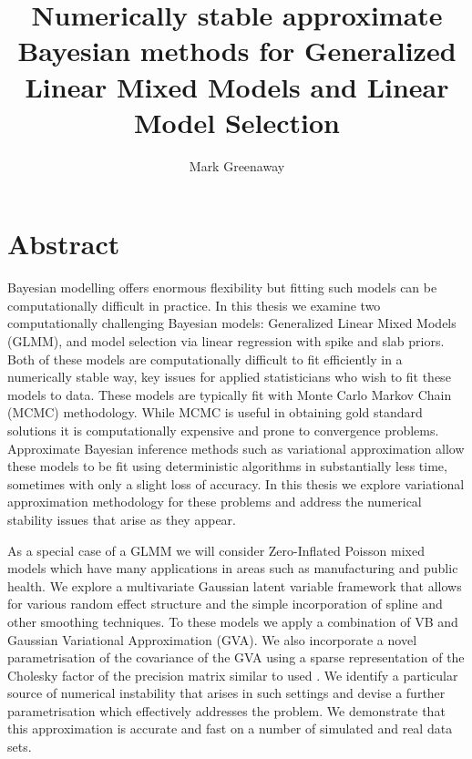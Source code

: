 \documentclass[11pt]{article}
\title{Numerically stable approximate Bayesian methods 
	for Generalized Linear Mixed Models and  Linear Model Selection}
\author{Mark Greenaway}
\begin{document}
\maketitle

\section*{Abstract}

Bayesian modelling offers enormous flexibility but fitting such models can be computationally 
difficult in practice. In this thesis we examine two computationally challenging Bayesian models: 
Generalized Linear Mixed Models (GLMM), and model selection via linear regression with spike and 
slab priors. Both of these models are computationally difficult to fit efficiently in a numerically 
stable way, key issues for applied statisticians who wish to fit these models to data. These models 
are typically fit with Monte Carlo Markov Chain (MCMC) methodology. While MCMC is useful in 
obtaining gold standard solutions it is computationally expensive and prone to convergence problems. 
Approximate Bayesian inference methods such as variational approximation allow these models to be 
fit using deterministic algorithms in substantially less time, sometimes with only a slight loss of 
accuracy. In this thesis we explore variational approximation methodology for these problems and 
address the numerical stability issues that arise as they appear.

As a special case of a GLMM we will consider Zero-Inflated Poisson mixed models which have many
applications in areas such as manufacturing and public health. We explore a multivariate Gaussian 
latent variable framework that allows for various random effect structure and the simple 
incorporation of spline and other smoothing techniques. To these models we apply a combination of VB 
and Gaussian Variational Approximation (GVA). We also incorporate a novel parametrisation of the 
covariance of the GVA using a sparse representation of the Cholesky factor of the precision matrix
similar to used \cite{Tan2018}. We identify a particular source of numerical instability that
arises in such settings and devise a further parametrisation which effectively addresses the problem.
We demonstrate that this approximation is accurate and fast on a number of simulated and real data 
sets.
\end{document}
